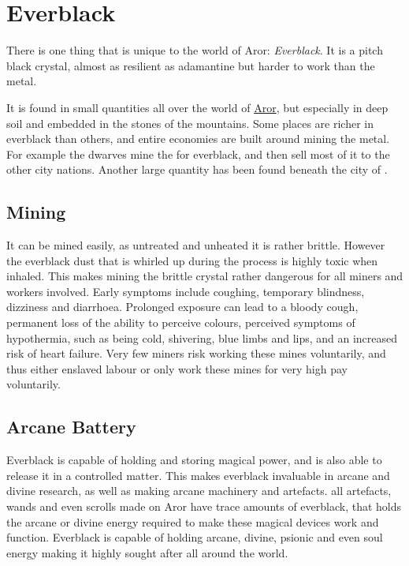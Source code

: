 \section{Everblack}
\label{sec:Everblack}

There is one thing that is unique to the world of Aror: \emph{Everblack}. It is
a pitch black crystal, almost as resilient as adamantine but harder to work
than the metal.

It is found in small quantities all over the world of \hyperref[sec:Aror]{Aror},
but especially in deep soil and embedded in the stones of the mountains. Some
places are richer in everblack than others, and entire economies are built
around mining the metal. For example the dwarves  mine the
 for everblack, and then sell most of it to the
other city nations. Another large quantity has been found beneath the city of
.

\subsection{Mining}

It can be mined easily, as untreated and unheated it is rather brittle. However
the everblack dust that is whirled up during the process is highly toxic when
inhaled. This makes mining the brittle crystal rather dangerous for all miners
and workers involved. Early symptoms include coughing, temporary blindness,
dizziness and diarrhoea. Prolonged exposure can lead to a bloody cough,
permanent loss of the ability to perceive colours, perceived symptoms of
hypothermia, such as being cold, shivering, blue limbs and lips, and an
increased risk of heart failure. Very few miners risk working these mines
voluntarily, and thus either enslaved labour or only work these mines for very
high pay voluntarily.

\subsection{Arcane Battery}

Everblack is capable of holding and storing magical power, and is also able to
release it in a controlled matter. This makes everblack invaluable in arcane
and divine research, as well as making arcane machinery and artefacts. all
artefacts, wands and even scrolls made on Aror have trace amounts of
everblack, that holds the arcane or divine energy required to make these
magical devices work and function. Everblack is capable of holding arcane,
divine, psionic and even soul energy making it highly sought after all around
the world.

